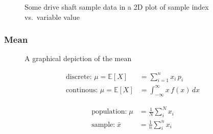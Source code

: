 \documentclass[
  a4paper,
]{scrbook}
\begin{document}
\begin{figure}[ht]


\caption{\label{fig-central-tend}Some drive shaft sample data in a 2D
plot of sample index vs.~variable value}

\end{figure}%

\subsubsection{Mean}\label{mean}

\begin{figure}[ht]


\caption{\label{fig-mean-ds}A graphical depiction of the mean}

\end{figure}%

\begin{align}
\text{discrete: } \mu = \mathbb{E}[X] &= \sum_{i=1}^{n} x_i \, p_i \\
\text{continous: }\mu = \mathbb{E}[X] &= \int_{-\infty}^{\infty} x \, f(x) \, dx
\end{align}

\begin{align}
\text{population:} \; \mu &= \frac{1}{N}\sum_i^{N} x_i \\
\text{sample:} \; \bar{x} &= \frac{1}{n}\sum_i^{n} x_i 
\end{align}
\end{document}
